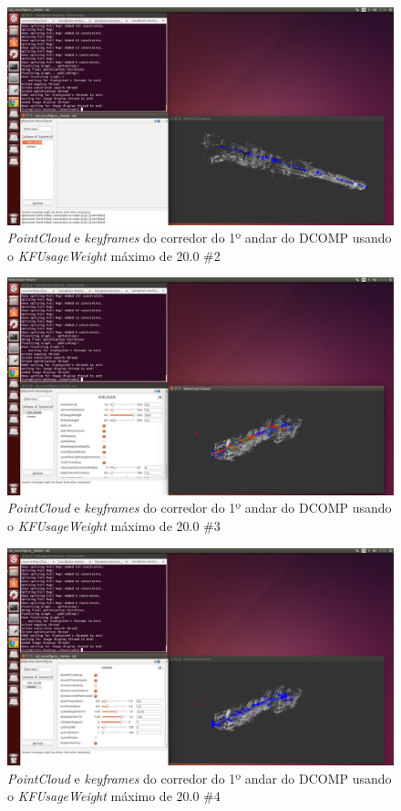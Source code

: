 \begin{figure}[!htb]
	\centering
		\includegraphics[width= \textwidth]{Imagens/figura3-35}
	\caption{\textit{PointCloud} e \textit{keyframes} do corredor do 1º andar do DCOMP usando o \textit{KFUsageWeight} máximo de 20.0 \#2}
	\label{fig3:33}
\end{figure}


\begin{figure}[!htb]
	\centering
		\includegraphics[width= \textwidth]{Imagens/figura3-36.png}
	\caption{\textit{PointCloud} e \textit{keyframes} do corredor do 1º andar do DCOMP usando o \textit{KFUsageWeight} máximo de 20.0 \#3}
	\label{fig3:34}
\end{figure}


\begin{figure}[!htb]
	\centering
		\includegraphics[width= \textwidth]{Imagens/figura3-37.png}
	\caption{\textit{PointCloud} e \textit{keyframes} do corredor do 1º andar do DCOMP usando o \textit{KFUsageWeight} máximo de 20.0 \#4}
	\label{fig3:35}
\end{figure}



